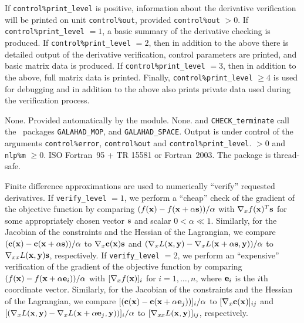 \documentclass{galahad}
\newcommand{\packagename}{CHECK}
\begin{document}

\galinfo
If {\tt control\%print\_level} is positive, information about the
derivative verification will be printed on unit {\tt control\-\%out},
provided {\tt control\%out} $> 0$.
If {\tt control\%print\_level} $= 1$, a basic summary of the
derivative checking is produced.  If {\tt control\%print\_level} $=
2$, then in addition to the above there is detailed output of the
derivative verification, control parameters are printed, and basic
matrix data is produced.  If {\tt control\%print\_level} $=
3$, then in addition to the above, full matrix data is printed.
Finally, {\tt control\%print\_level} $\geq 4$ is used for debugging
and in addition to the above also prints private data used during the
verification process.    


\galgeneral

\galcommon None.
\galworkspace Provided automatically by the module.
\galroutines None. 
\galmodules {\tt \packagename\_verify} and {\tt \packagename\_terminate} call the \galahad\ packages
{\tt GALAHAD\_MOP}, and
{\tt GALAHAD\_SPACE}.
\galio Output is under control of the arguments
 {\tt control\%error}, {\tt control\%out} and {\tt control\%print\_level}.
 $> 0$ and {\tt nlp\%m} $\geq 0$.
\galportability ISO Fortran~95 + TR 15581 or Fortran~2003. 
The package is thread-safe.


\galmethod
Finite difference approximations are used to numerically ``verify'' requested
derivatives.  If {\tt verify\_level} $=1$, we perform a
``cheap'' check of the gradient of the objective function by
comparing $(f({\mathbf{x}}) - f({\mathbf{x}}+\alpha {\mathbf{s}}))/\alpha$ with $\nabla_x f({\mathbf{x}})^T{\mathbf{s}}$
for some appropriately chosen vector ${\mathbf{s}}$ and scalar $0 < \alpha \ll
1$.  Similarly, for the Jacobian of the constraints and the Hessian of
the Lagrangian, we compare $({\mathbf{c}}({\mathbf{x}}) - {\mathbf{c}}({\mathbf{x}}+\alpha
{\mathbf{s}}))/\alpha$ to $\nabla_x {\mathbf{c}}({\mathbf{x}}){\mathbf{s}}$ and $(\nabla_xL({\mathbf{x}},{\mathbf{y}})
- \nabla_xL({\mathbf{x}}+\alpha{\mathbf{s}},{\mathbf{y}}))/\alpha$ to $\nabla_{xx}
L({\mathbf{x}},{\mathbf{y}}){\mathbf{s}}$, respectively.  If {\tt verify\_level} $=2$, we perform an
``expensive'' verification of the gradient of the objective function by
comparing $(f({\mathbf{x}}) - f({\mathbf{x}}+\alpha{\mathbf{e}}_i))/\alpha$ with $[\nabla_x
f({\mathbf{x}})]_i$ for $i = 1, \dots, n$, where ${\mathbf{e}}_i$ is the $i$th
coordinate vector.  Similarly, for the Jacobian of the constraints and the Hessian of
the Lagrangian, we compare $[({\mathbf{c}}({\mathbf{x}}) - {\mathbf{c}}({\mathbf{x}}+\alpha
{\mathbf{e}}_j))]_i/\alpha$ to $[\nabla_x {\mathbf{c}}({\mathbf{x}})]_{ij}$ and $[(\nabla_xL({\mathbf{x}},{\mathbf{y}})
- \nabla_xL({\mathbf{x}}+\alpha{\mathbf{e}}_j,{\mathbf{y}}))]_i/\alpha$ to $[\nabla_{xx}
L({\mathbf{x}},{\mathbf{y}})]_{ij}$, respectively.   
\end{document}
